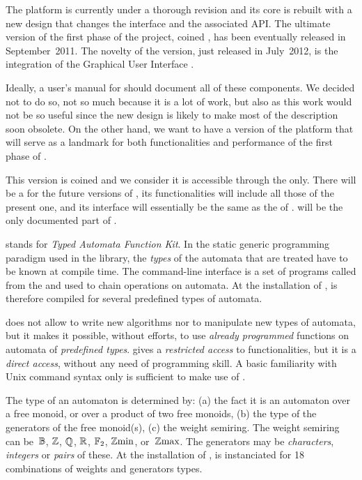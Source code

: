 The \vcsn platform is currently under a thorough revision and its
core is rebuilt with a new design that changes the interface and the
associated API. The ultimate version of the first phase of the
project, coined \vcsnvo, has been 
eventually released in September~2011. 
The novelty of the \vcsnv version, just released in July~2012, is
the integration of the Graphical User Interface \vgi.


\medskip

Ideally, a user's manual for \vcsn should document all of these 
components. 
We decided not to do so, not so much because it is a lot of work, but 
also as this work would not be so useful since the new design is 
likely to make most of the description soon obsolete.
On the other hand, we want to have a version of the platform that 
will serve as  
a landmark for both functionalities and  
performance of the first phase of \vcsn.


This version is coined \vcsnv and we consider it is accessible 
through the \tafkit only.
There will be a \tafkit for the future versions of \vcsn,
its  functionalities will include all those of the present one,
and its interface will essentially be the same as the \tafkit of 
\vcsnv.
\tafkit will be the only documented part of \vcsnv.



\tafkit stands for \emph{Typed Automata Function Kit}. In the static
generic programming paradigm used in the \vcsn library, the
\emph{types} of the automata that are treated have to be known at
compile time. The command-line interface \tafkit is a set of
programs called from the  and used to chain operations
on automata. At the installation of \vcsn, \tafkit is therefore
compiled for several predefined types of automata.

\tafkit does not allow to write new algorithms nor to manipulate new
types of automata, but it makes it possible, without efforts, to use
\emph{already programmed} functions on automata of \emph{predefined
types}. \tafkit gives a \emph{restricted access} to \vcsn
functionalities, but it is a \emph{direct access}, without any need
of programming skill. A basic familiarity with Unix command syntax
only is sufficient to make use of \tafkit.


The type of an automaton is determined by: (a) the fact it is an
automaton over a free monoid, or over a product of two free monoids,
(b) the type of the generators of the free monoid(s), (c) the weight
semiring. The weight semiring can be~$\mathbb{B}$, $\mathbb{Z}$, $\mathbb{Q}$, $\mathbb{R}$,
$\mathbb{F}_{2}$, $\mathbb{Z}\mathrm{min}$,   or~$\mathbb{Z}\mathrm{max}$. The generators may be
\emph{characters}, \emph{integers} or \emph{pairs} of these. At the
installation of \vcsn, \tafkit is instanciated for 18 combinations
of weights and generators types.

